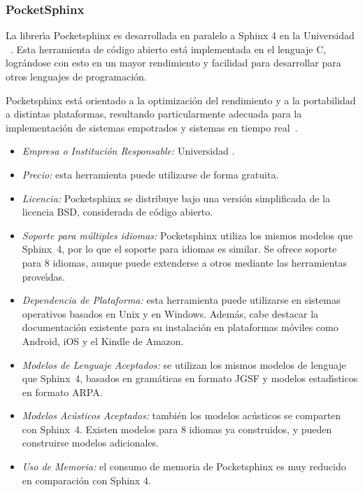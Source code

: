 \subsubsection{PocketSphinx}
\label{sec:pocketsphinx}

La librer{\'\i}a Pocketsphinx es desarrollada en paralelo a Sphinx 4 en la Universidad
\mbox{ \cite{PocketSphinxHomePage}}. Esta herramienta de c\'odigo abierto
est\'a implementada en el lenguaje C, logr\'andose con esto en un mayor rendimiento y facilidad
para desarrollar  para otros lenguajes de programaci\'on.

Pocketsphinx est\'a orientado a la optimizaci\'on del rendimiento y a la portabilidad a distintas
plataformas, resultando particularmente adecuada para la implementaci\'on de sistemas empotrados
y sistemas en tiempo \mbox{real \cite{HugginsDainesPocketSphinx2006}}.

\begin{itemize}
	\item \emph{Empresa o Instituci\'on Responsable:} Universidad .
	\item \emph{Precio:} esta herramienta puede utilizarse de forma gratuita.
	\item \emph{Licencia:} Pocketsphinx se distribuye bajo una versi\'on simplificada de la licencia
	BSD, considerada de c\'odigo abierto.
	\item \emph{Soporte para m\'ultiples idiomas:} Pocketsphinx utiliza los mismos modelos
	que \mbox{Sphinx 4}, por lo que el soporte para idiomas es similar. Se ofrece soporte para 8
	idiomas, aunque puede extenderse a otros mediante las herramientas prove{\'\i}das.
	\item \emph{Dependencia de Plataforma:} esta herramienta puede utilizarse en sistemas operativos
	basados en Unix y en Windows. Adem\'as, cabe destacar la documentaci\'on existente para su instalaci\'on
	en plataformas m\'oviles como Android, iOS y el Kindle de Amazon.
	\item \emph{Modelos de Lenguaje Aceptados:} se utilizan los mismos modelos de lenguaje que \mbox{Sphinx 4},
	basados en gram\'aticas en formato JGSF y modelos estad{\'\i}sticos en formato ARPA.
	\item \emph{Modelos Ac\'usticos Aceptados:} tambi\'en los modelos ac\'usticos se comparten con \mbox{Sphinx 4}.
	Existen modelos para 8 idiomas ya construidos, y pueden construirse modelos adicionales.
	\item \emph{Uso de Memoria:} el consumo de memoria de Pocketsphinx es muy reducido en comparaci\'on con
	Sphinx 4.
\end{itemize}